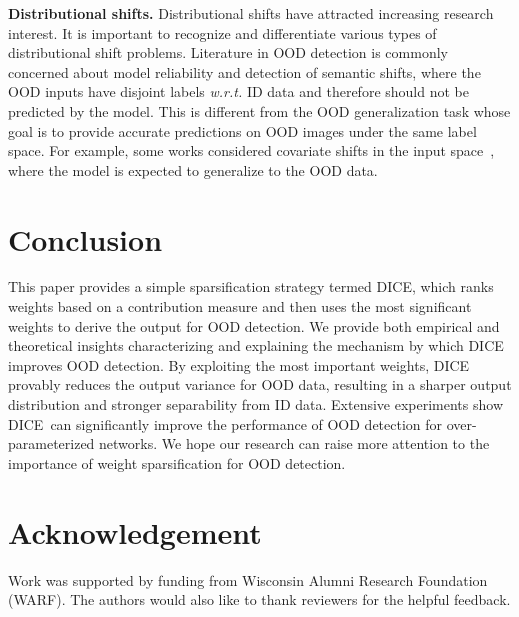 \documentclass[runningheads]{llncs}
\newcommand{\methodAbbr}{DICE~}
\begin{document}
\noindent \textbf{Distributional shifts.} Distributional shifts have attracted increasing research interest. It is important to recognize and differentiate various types of distributional shift problems. Literature in OOD detection is commonly concerned about model reliability and detection of semantic shifts, where the OOD inputs have disjoint labels \emph{w.r.t.} ID data and therefore {should not be predicted by the model}. This is different from the OOD generalization task whose goal is to provide accurate predictions on OOD images under the same label space. For example, some works considered covariate shifts in the input space~\cite{koh2021wilds,hendrycks2019benchmarking,ovadia2019can,sun2020test,zhou2021domain}, where the model is expected to generalize to the OOD data.



\section{Conclusion}
This paper provides a simple sparsification strategy termed DICE, which ranks weights based on a contribution measure and then uses the most significant weights to derive the output for OOD detection. We provide both empirical and theoretical insights characterizing and explaining the mechanism by which DICE improves OOD detection. By exploiting the most important weights, DICE provably reduces the output variance for OOD data, resulting in a sharper output distribution and stronger separability from ID data. Extensive experiments show \methodAbbr can significantly improve the performance of OOD detection for over-parameterized networks. We hope our research can raise more attention to the importance of weight sparsification for OOD detection.  


\section*{Acknowledgement}

Work was supported by funding from Wisconsin Alumni Research Foundation (WARF). The authors would also like to thank reviewers for the helpful  feedback.


\clearpage







\appendix
\clearpage
\newpage

\onecolumn
\end{document}
